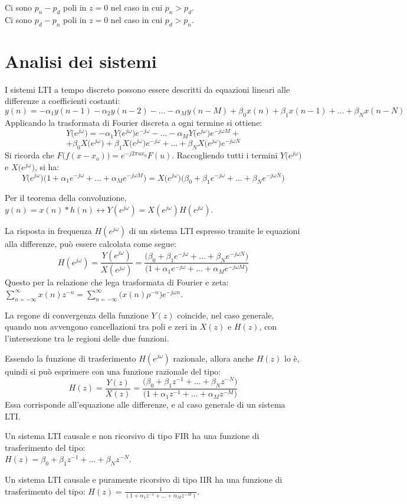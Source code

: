 Ci sono $p_n - p_d$ poli in $z = 0$ nel caso in cui $p_n > p_d$. \\
Ci sono $p_d - p_n$ poli in $z = 0$ nel caso in cui $p_d > p_n$. 

\section{Analisi dei sistemi}
I sistemi LTI a tempo discreto possono essere descritti da equazioni lineari alle differenze a coefficienti costanti:
$$y(n) = -\alpha_1y(n-1) - \alpha_2y(n - 2) - \dots - \alpha_My(n - M) + \beta_0x(n) + \beta_1x(n - 1) + \dots + \beta_Nx(n - N)$$
Applicando la trasformata di Fourier discreta a ogni termine si ottiene:
$$Y\big(e^{j\omega}\big) = -\alpha_1Y\big(e^{j\omega}\big)e^{-j\omega} - \dots - \alpha_MY\big(e^{j\omega}\big)e^{-j\omega M} + $$
$$ + \beta_0 X\big(e^{j\omega}\big) + \beta_1X\big(e^{j\omega}\big)e^{-j\omega} + \dots + \beta_NX\big(e^{j\omega}\big)e^{-j\omega N}$$
Si ricorda che $F\big(f(x - x_o)\big) = e^{-j2\pi ux_0} F(u)$. Raccogliendo tutti i termini $Y\big(e^{j\omega}\big)$ e $X\big(e^{j\omega}\big)$, si ha:
$$Y\big(e^{j\omega}\big) \big(1 + \alpha_1e^{-j\omega} + \dots + \alpha_Me^{-j\omega M}\big) = X\big(e^{j\omega}\big) \big(\beta_0 + \beta_1e^{-j\omega} + \dots + \beta_Ne^{-j\omega N}\big)$$

Per il teorema della convoluzione, $y(n) = x(n) * h(n) \leftrightarrow Y(e^{j\omega}) = X(e^{j\omega})H(e^{j\omega})$.

La risposta in frequenza $H(e^{j\omega})$ di un sistema LTI espresso tramite le equazioni alla differenze, può essere calcolata come segue:
$$H(e^{j\omega}) = \frac{Y(e^{j\omega})}{X(e^{j\omega})} = \frac{\big(\beta_0 + \beta_1e^{-j\omega} + \dots + \beta_Ne^{-j\omega N}\big)}{\big(1 + \alpha_1e^{-j\omega} + \dots + \alpha_Me^{-j\omega M}\big)}$$
Questo per la relazione che lega trasformata di Fourier e zeta: \\
$\sum_{n=-\infty}^{\infty} x(n)z^{-n} = \sum_{n=-\infty}^{\infty} \big(x(n)\rho^{-n}\big)e^{-j\omega n}$.

La regone di convergenza della funzione $Y(z)$ coincide, nel caso generale, quando non avvengono cancellazioni tra poli e zeri in $X(z)$ e $H(z)$, con l'intersezione tra le regioni delle due funzioni.

Essendo la funzione di trasferimento $H(e^{j\omega})$ razionale, allora anche $H(z)$ lo è, quindi si può esprimere con una funzione razionale del tipo:
$$H(z) = \frac{Y(z)}{X(z)} = \frac{\big(\beta_0 + \beta_1z^{-1} + \dots + \beta_Nz^{-N}\big)}{\big(1 + \alpha_1z^{-1} + \dots + \alpha_Mz^{-M}\big)}$$
Essa corrisponde all'equazione alle differenze, e al caso generale di un sistema LTI.

Un sistema LTI causale e non ricorsivo di tipo FIR ha una funzione di trasferimento del tipo: \\
$H(z) = \beta_0 + \beta_1z^{-1} + \dots + \beta_Nz^{-N}$.

Un sistema LTI causale e puramente ricorsivo di tipo IIR ha una funzione di trasferimento del tipo:
$H(z) = \frac{1}{(1 + \alpha_1z^{-1} + \dots + \alpha_Mz^{-M})}$.

